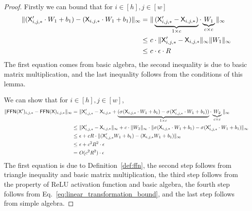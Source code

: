 \begin{proof}
    Firstly we can bound that for $i \in [h], j \in [w]$
    \begin{align}\label{eq:linear_transformation_bound}
        \| (\mathsf{X}'_{i,j,*}\cdot W_1 +b_1) - (\mathsf{X}_{i,j,*}\cdot W_1 +b_1)\|_\infty =&~ \| \underbrace{(\mathsf{X}'_{i,j,*}-\mathsf{X}_{i,j,*})}_{1 \times c} \cdot \underbrace{W_1}_{c\times c}\|_\infty\notag\\
        \leq&~ c \cdot \|\mathsf{X}'_{i,j,*}-\mathsf{X}_{i,j,*}\|_\infty \|W_1 \|_\infty\notag\\
        \leq&~ c \cdot \epsilon \cdot R
    \end{align}
    The first equation comes from basic algebra, the second inequality is due to basic matrix multiplication, and the last inequality follows from the conditions of this lemma.
    
    We can show that for $i \in [h], j \in [w]$,
    \begin{align*}
        \| \mathsf{FFN}(\mathsf{X}')_{i,j,*} - \mathsf{FFN}(\mathsf{X})_{i,j,*} \|_\infty=&~ \| \mathsf{X}'_{i,j,*}-\mathsf{X}_{i,j,*} +\underbrace{ (\sigma(\mathsf{X}_{i,j,*}\cdot W_1 + b_1)- \sigma(\mathsf{X}'_{i,j,*}\cdot W_1 + b_1))}_{1 \times c} \cdot \underbrace{W_2}_{c\times c}\|_\infty \\
        \leq&~ \| \mathsf{X}'_{i,j,*}-\mathsf{X}_{i,j,*}\|_\infty +c\cdot \|W_2\|_\infty \cdot \|\sigma(\mathsf{X}_{i,j,*}\cdot W_1 + b_1)- \sigma(\mathsf{X}'_{i,j,*}\cdot W_1 + b_1)\|_\infty\\
        \leq&~ \epsilon + c R \cdot \| (\mathsf{X}'_{i,j,*} W_1 +b_1) - (\mathsf{X}_{i,j,*} W_1 +b_1)\|_\infty\\
        \leq&~ \epsilon + c^2 R^2 \cdot \epsilon \\
        =&~ O(c^2 R^2) \cdot \epsilon
    \end{align*}
    The first equation is due to Definition~\ref{def:ffn}, the second step follows from triangle inequality and basic matrix multiplication, the third step follows from the property of ReLU activation function and basic algebra, the fourth step follows from Eq.~\eqref{eq:linear_transformation_bound}, and the last step follows from simple algebra.
\end{proof}

